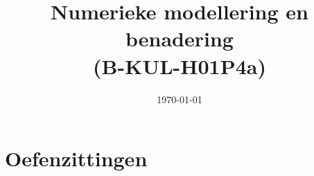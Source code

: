 \documentclass[11pt]{book}
\title{Numerieke modellering en benadering \\ (B-KUL-H01P4a)}
\date{\today}
\author{\theauthors}
\theoremstyle{mystyle}
\begin{document}
\frontmatter

\tableofcontents

\listoffigures

\mainmatter






\chapter{Oefenzittingen}

%
%
%
%
%
%
%
\appendix



\nocite{*}
\end{document}
